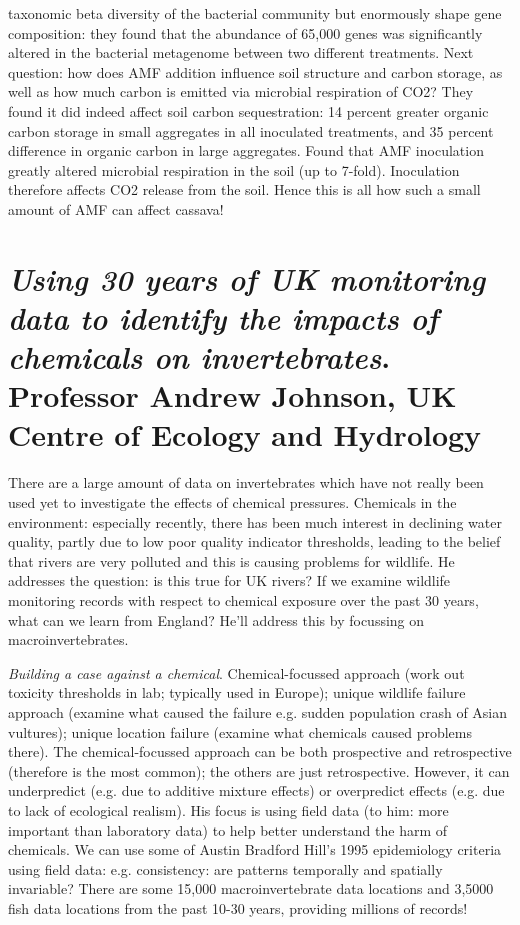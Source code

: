 \documentclass[9pt]{article}
\begin{document}
taxonomic beta diversity of the bacterial community but enormously shape gene composition: they found that the abundance of 65,000 genes was significantly altered in the bacterial metagenome between two different treatments. Next question: how does AMF addition influence soil structure and carbon storage, as well as how much carbon is emitted via microbial respiration of CO2? They found it did indeed affect soil carbon sequestration: 14 percent greater organic carbon storage in small aggregates in all inoculated treatments, and 35 percent difference in organic carbon in large aggregates. Found that AMF inoculation greatly altered microbial respiration in the soil (up to 7-fold). Inoculation therefore affects CO2 release from the soil. Hence this is all how such a small amount of AMF can affect cassava!
	
	 
	
	\section{\textit{Using 30 years of UK monitoring data to identify the impacts of chemicals on invertebrates}. Professor Andrew Johnson, UK Centre of Ecology and Hydrology}
	
	There are a large amount of data on invertebrates which have not really been used yet to investigate the effects of chemical pressures. Chemicals in the environment: especially recently, there has been much interest in declining water quality, partly due to low poor quality indicator thresholds, leading to the belief that rivers are very polluted and this is causing problems for wildlife. He addresses the question: is this true for UK rivers? If we examine wildlife monitoring records with respect to chemical exposure over the past 30 years, what can we learn from England? He’ll address this by focussing on macroinvertebrates. 
	
	\textit{Building a case against a chemical}. Chemical-focussed approach (work out toxicity thresholds in lab; typically used in Europe); unique wildlife failure approach (examine what caused the failure e.g. sudden population crash of Asian vultures); unique location failure (examine what chemicals caused problems there). The chemical-focussed approach can be both prospective and retrospective (therefore is the most common); the others are just retrospective. However, it can underpredict (e.g. due to additive mixture effects) or overpredict effects (e.g. due to lack of ecological realism). His focus is using field data (to him: more important than laboratory data) to help better understand the harm of chemicals. We can use some of Austin Bradford Hill’s 1995 epidemiology criteria using field data: e.g. consistency: are patterns temporally and spatially invariable? There are some 15,000 macroinvertebrate data locations and 3,5000 fish data locations from the past 10-30 years, providing millions of records!
	
\end{document}
